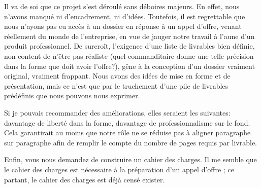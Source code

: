 Il va de soi que ce projet s'est déroulé sans déboires majeurs.  En effet, nous
n'avons manqué ni d'encadrement, ni d'idées.  Toutefois, il est regrettable que
nous n'ayons pas eu accès à un dossier en réponse à un appel d'offre, venant
réellement du monde de l'entreprise, en vue de jauger notre travail à l'aune
d'un produit professionnel.  De surcroît, l'exigence d'une liste de livrables
bien définie, non content de n'être pas réaliste (quel commanditaire donne une
telle précision dans la forme que doit avoir l'offre?), gêne à la conception
d'un dossier vraiment original, vraiment frappant.  Nous avons des idées de mise
en forme et de présentation, mais ce n'est que par le truchement d'une pile de
livrables prédéfinis que nous pouvons nous exprimer.

Si je pouvais recommander des améliorations, elles seraient les suivantes:
davantage de liberté dans la forme, davantage de professionnalisme sur le fond.
Cela garantirait au moins que notre rôle ne se réduise pas à aligner paragraphe
sur paragraphe afin de remplir le compte du nombre de pages requis par livrable.

Enfin, vous nous demandez de construire un cahier des charges.  Il me semble que
le cahier des charges est nécessaire à la préparation d'un appel d'offre ; ce
partant, le cahier des charges est déjà censé exister.
